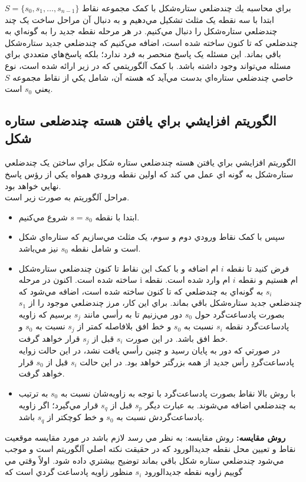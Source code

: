 \documentclass{book}
\begin{document}
  براي محاسبه يك چندضلعي ستاره‌شكل با کمک مجموعه نقاط 
  $S=\{s_{0}, s_{1},\dots ,s_{n-1}\} $
  	ابتدا با سه نقطه يک مثلث تشکيل مي‌دهيم و به دنبال آن مراحل ساخت يک چند چندضلعي ستاره‌شکل را دنبال مي‌کنيم. در هر مرحله نقطه جديد را به گونه‌اي به چندضلعي که تا کنون ساخته شده است، اضافه مي‌کنيم كه چندضلعي جديد ستاره‌شكل باقي بماند.  
  	اين مسئله يک پاسخ منحصر به فرد ندارد؛ بلکه پاسخ‌هاي متعددي براي مسئله مي‌تواند وجود داشته باشد. با کمک آلگوريتمي که در زير ارائه شده است، نوع خاصي چندضلعي ستاره‌اي بدست مي‌آيد كه هسته آن، شامل يکي از نقاط مجموعه $S$  يعني $s_{0}$ است.
\subsection*{الگوريتم افزايشي براي يافتن هسته چند‌ضلعی ستاره شکل}
الگوريتم افزايشي براي يافتن هسته چندضلعي ستاره شکل براي ساختن يک چندضلعي ستاره‌شکل به گونه اي عمل مي کند که  اولين نقطه ورودي همواه يکي از رؤس پاسخ نهايي خواهد بود.\\
مراحل آلگوريتم به صورت زير است.
\begin{itemize}
	\item 
		ابتدا با نقطه $s=s_{0}$ شروع مي‌کنيم.
\item 
	سپس با کمک نقاط ورودي دوم و سوم، يک مثلث مي‌سازيم که ستاره‌اي شکل است و شامل نقطه $s_{0}$ نيز مي‌باشد. 
	\item 
		فرض کنيد تا نقطه $i$ ام اضافه و با کمک اين نقاط تا کنون چندضلعي ستاره‌شکل ساخته شده است. اکنون در مرحله i ام هستيم و نقطه $i$ ام وارد شده است. نقطه $s_{i}$ به گونه‌اي به چندضلعي که تا کنون ساخته شده است، اضافه مي‌شود كه چندضلعي جديد ستاره‌شكل باقي بماند. براي اين کار، مرز چندضلعي موجود را از $s_{1}$ بصورت پادساعت‌گرد حول $s_{0}$  دور مي‌زنيم تا به رأسي مانند $s_{j}$ برسيم كه زاويه پادساعت‌گرد نقطه $s_{i}$ نسبت به $s_{0}$  و خط افق بلافاصله کمتر از $s_{j}$ نسبت به $s_{0}$ و خط افق باشد. در اين صورت $s_{i}$ قبل از $s_{j}$ قرار خواهد گرفت. \\
	در صورتي كه دور به پايان رسيد و چنين رأسي يافت نشد، در اين حالت زوايه پادساعت‌گردِ رأس جديد از همه بزرگتر خواهد بود. در اين حالت $s_{i}$ قبل از $s_{0}$ قرار خواهد گرفت.
	\item 
		با روش بالا نقاط بصورت پادساعت‌گرد با توجه به زاويه‌شان نسبت به $s_{0}$ به ترتيب به چندضلعي اضافه مي‌شوند. به عبارت ديگر $s_{p}$ قبل از $s_{q}$ قرار مي‌گيرد؛ اگر زاويه پادساعت‌گردش نسبت به $s_{0}$ و خط کوچکتر از $s_{q}$ باشد.
\end{itemize}
\textbf{روش مقایسه:}
روش مقايسه: به نظر مي رسد لازم باشد در مورد مقايسه موقعيت نقاط و تعيين محل نقطه جديد‌الورود که در حقيقت نکته اصلي آلگوريتم است و موجب مي‌شود چندضلعي ستاره شکل باقي بماند توضيح بيشتري داده شود. اولاً وقتي مي گوييم زاويه نقطه جديدالورود $s_{i}$ منظور زاويه پادساعت گردي است که 
\end{document}
